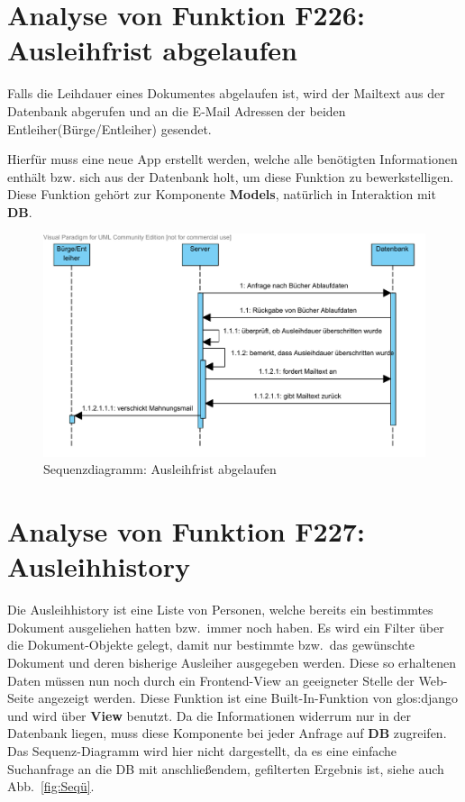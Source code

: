 \section{Analyse von Funktion F226: Ausleihfrist abgelaufen}
Falls die Leihdauer eines Dokumentes abgelaufen ist, wird der Mailtext aus der 
Datenbank abgerufen und an die E-Mail Adressen der beiden Entleiher(Bürge/Entleiher) gesendet.

Hierfür muss eine neue App erstellt werden, welche alle benötigten Informationen enthält bzw. sich aus der Datenbank holt, um diese Funktion zu bewerkstelligen.
Diese Funktion gehört zur Komponente \textbf{Models}, natürlich in Interaktion mit \textbf{DB}.
\begin{figure}
\includegraphics[width=0.8\linewidth]{bilder/SeqMail.pdf}
\caption{Sequenzdiagramm: Ausleihfrist abgelaufen}
\label{fig:226}
\end{figure}

\section{Analyse von Funktion F227: Ausleihhistory}
\label{f:227}
Die Ausleihhistory ist eine Liste von Personen, welche bereits ein bestimmtes Dokument ausgeliehen hatten bzw.\ immer noch haben.
Es wird ein Filter über die Dokument-Objekte gelegt, damit nur bestimmte bzw.\ das gewünschte Dokument und deren bisherige Ausleiher ausgegeben werden. Diese so erhaltenen Daten müssen nun noch durch ein Frontend-View an geeigneter Stelle der Web-Seite angezeigt werden.
Diese Funktion ist eine Built-In-Funktion von \gls{glos:django} und wird über \textbf{View} benutzt. Da die Informationen widerrum nur in der Datenbank liegen, muss diese Komponente bei jeder Anfrage auf \textbf{DB} zugreifen.
Das Sequenz-Diagramm wird hier nicht dargestellt, da es eine einfache Suchanfrage an die DB mit anschließendem, gefilterten Ergebnis ist, siehe auch Abb.\ \ref{fig:Seqü}.

